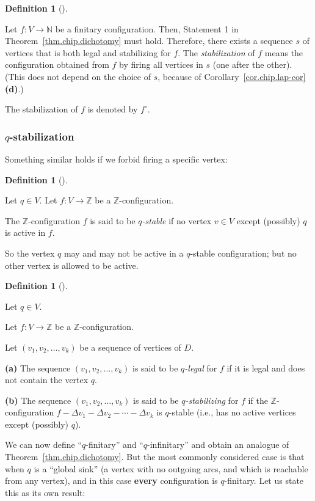 \documentclass[numbers=enddot,12pt,final,onecolumn,notitlepage]{scrartcl}%
\theoremstyle{definition}
\newtheorem{defi}[theo]{Definition}
\newenvironment{definition}[1][]
{\begin{defi}[#1]\begin{leftbar}}
{\end{leftbar}\end{defi}}
\newcommand{\NN}{\mathbb{N}}
\newcommand{\ZZ}{\mathbb{Z}}
\newcommand{\tup}[1]{\left( #1 \right)}
\begin{document}
\begin{definition} \label{def.chip.stabilization}
Let $f : V \to \NN$ be a finitary configuration.
Then, Statement 1 in Theorem~\ref{thm.chip.dichotomy} must
hold.
Therefore, there exists a sequence $s$ of vertices that is both
legal and stabilizing for $f$.
The \textit{stabilization} of $f$ means
the configuration obtained from $f$ by firing
all vertices in $s$ (one after the other).
(This does not depend on the choice of $s$, because of
Corollary~\ref{cor.chip.lap-cor} \textbf{(d)}.)

The stabilization of $f$ is denoted by $f^\circ$.
\end{definition}

\subsubsection{$q$-stabilization}

Something similar holds if we forbid firing a specific
vertex:

\begin{definition}
Let $q \in V$.
Let $f : V \to \ZZ$ be a $\ZZ$-configuration.

The $\ZZ$-configuration $f$ is said to be
\textit{$q$-stable} if no vertex $v \in V$ except
(possibly) $q$ is active in $f$.
\end{definition}

So the vertex $q$ may and may not be active in a
$q$-stable configuration; but no other vertex is allowed
to be active.

\begin{definition}
Let $q \in V$.

Let $f : V \to \ZZ$ be a $\ZZ$-configuration.

Let $\tup{v_1, v_2, \ldots, v_k}$ be a sequence of vertices of
$D$.

\textbf{(a)} The sequence $\tup{v_1, v_2, \ldots, v_k}$ is said
to be \textit{$q$-legal} for $f$ if it is legal and does not
contain the vertex $q$.

\textbf{(b)} The sequence $\tup{v_1, v_2, \ldots, v_k}$ is said
to be \textit{$q$-stabilizing} for $f$ if the $\ZZ$-configuration
$f - \Delta v_1 - \Delta v_2 - \cdots - \Delta v_k$ is
$q$-stable (i.e., has no active vertices except (possibly) $q$).
\end{definition}

We can now define ``$q$-finitary'' and ``$q$-infinitary''
and obtain an analogue of Theorem~\ref{thm.chip.dichotomy}.
But the most commonly considered case is that when $q$ is
a ``global sink'' (a vertex with no outgoing arcs, and which
is reachable from any vertex),
and in this case \textbf{every} configuration is
$q$-finitary.
Let us state this as its own result:
\end{document}
